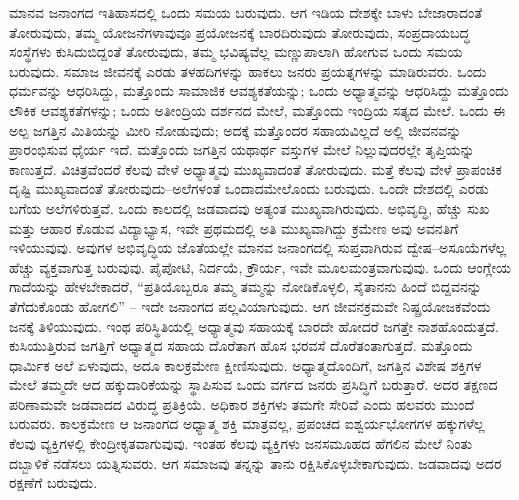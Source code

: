 ಮಾನವ ಜನಾಂಗದ ಇತಿಹಾಸದಲ್ಲಿ ಒಂದು ಸಮಯ ಬರುವುದು. ಆಗ ಇಡಿಯ ದೇಶಕ್ಕೇ ಬಾಳು ಬೇಜಾರಾದಂತೆ ತೋರುವುದು, ತಮ್ಮ ಯೋಜನೆಗಳಾವುವೂ ಪ್ರಯೋಜನಕ್ಕೆ ಬಾರದಿರುವುದು ತೋರುವುದು, ಸಂಪ್ರದಾಯಬದ್ಧ ಸಂಸ್ಥೆಗಳು ಕುಸಿದುಬಿದ್ದಂತೆ ತೋರುವುದು, ತಮ್ಮ ಭವಿಷ್ಯವೆಲ್ಲ ಮಣ್ಣುಪಾಲಾಗಿ ಹೋಗುವ ಒಂದು ಸಮಯ ಬರುವುದು. ಸಮಾಜ ಜೀವನಕ್ಕೆ ಎರಡು ತಳಹದಿಗಳನ್ನು ಹಾಕಲು ಜನರು ಪ್ರಯತ್ನಗಳನ್ನು ಮಾಡಿರುವರು. ಒಂದು ಧರ್ಮವನ್ನು ಆಧರಿಸಿದ್ದು, ಮತ್ತೊಂದು ಸಾಮಾಜಿಕ ಆವಶ್ಯಕತೆಯನ್ನು; ಒಂದು ಅಧ್ಯಾತ್ಮವನ್ನು ಆಧರಿಸಿದ್ದು ಮತ್ತೊಂದು ಲೌಕಿಕ ಆವಶ್ಯಕತೆಗಳನ್ನು; ಒಂದು ಅತೀಂದ್ರಿಯ ದರ್ಶನದ ಮೇಲೆ, ಮತ್ತೊಂದು ಇಂದ್ರಿಯ ಸತ್ಯದ ಮೇಲೆ. ಒಂದು ಈ ಅಲ್ಪ ಜಗತ್ತಿನ ಮಿತಿಯನ್ನು ಮೀರಿ ನೋಡುವುದು; ಅದಕ್ಕೆ ಮತ್ತೊಂದರ ಸಹಾಯವಿಲ್ಲದೆ ಅಲ್ಲಿ ಜೀವನವನ್ನು ಪ್ರಾರಂಭಿಸುವ ಧೈರ್ಯ ಇದೆ. ಮತ್ತೊಂದು ಜಗತ್ತಿನ ಯಥಾರ್ಥ ವಸ್ತುಗಳ ಮೇಲೆ ನಿಲ್ಲುವುದರಲ್ಲೇ ತೃಪ್ತಿಯನ್ನು ಕಾಣುತ್ತದೆ. ವಿಚಿತ್ರವೆಂದರೆ ಕೆಲವು ವೇಳೆ ಅಧ್ಯಾತ್ಮವು ಮುಖ್ಯವಾದಂತೆ ತೋರುವುದು. ಮತ್ತೆ ಕೆಲವು ವೇಳೆ ಪ್ರಾಪಂಚಿಕ ದೃಷ್ಟಿ ಮುಖ್ಯವಾದಂತೆ ತೋರುವುದು–ಅಲೆಗಳಂತೆ ಒಂದಾದಮೇಲೊಂದು ಬರುವುದು. ಒಂದೇ ದೇಶದಲ್ಲಿ ಎರಡು ಬಗೆಯ ಅಲೆಗಳಿರುತ್ತವೆ. ಒಂದು ಕಾಲದಲ್ಲಿ ಜಡವಾದವು ಅತ್ಯಂತ ಮುಖ್ಯವಾಗಿರುವುದು. ಅಭಿವೃದ್ಧಿ, ಹೆಚ್ಚು ಸುಖ ಮತ್ತು ಆಹಾರ ಕೊಡುವ ವಿದ್ಯಾಭ್ಯಾಸ, ಇವೇ ಪ್ರಥಮದಲ್ಲಿ ಅತಿ ಮುಖ್ಯವಾಗಿದ್ದು ಕ್ರಮೇಣ ಅವು ಅವನತಿಗೆ ಇಳಿಯುವುವು. ಅವುಗಳ ಅಭಿವೃದ್ಧಿಯ ಜೊತೆಯಲ್ಲೇ ಮಾನವ ಜನಾಂಗದಲ್ಲಿ ಸುಪ್ತವಾಗಿರುವ ದ್ವೇಷ–ಅಸೂಯೆಗಳೆಲ್ಲ ಹೆಚ್ಚು ವ್ಯಕ್ತವಾಗುತ್ತ ಬರುವುವು. ಪೈಪೋಟಿ, ನಿರ್ದಯೆ, ಕ್ರೌರ್ಯ, ಇವೇ ಮೂಲಮಂತ್ರವಾಗುವುವು. ಒಂದು ಆಂಗ್ಲೇಯ ಗಾದೆಯನ್ನು ಹೇಳಬೇಕಾದರೆ, “ಪ್ರತಿಯೊಬ್ಬರೂ ತಮ್ಮ ತಮ್ಮನ್ನು ನೋಡಿಕೊಳ್ಳಲಿ, ಸೈತಾನನು ಹಿಂದೆ ಬಿದ್ದವನನ್ನು ತೆಗೆದುಕೊಂಡು ಹೋಗಲಿ” – ಇದೇ ಜನಾಂಗದ ಪಲ್ಲವಿಯಾಗುವುದು. ಆಗ ಜೀವನಕ್ರಮವೇ ನಿಷ್ಪ್ರಯೋಜಕವೆಂದು ಜನಕ್ಕೆ ತಿಳಿಯುವುದು. ಇಂಥ ಪರಿಸ್ಥಿತಿಯಲ್ಲಿ ಅಧ್ಯಾತ್ಮವು ಸಹಾಯಕ್ಕೆ ಬಾರದೇ ಹೋದರೆ ಜಗತ್ತೇ ನಾಶಹೊಂದುತ್ತದೆ. ಕುಸಿಯುತ್ತಿರುವ ಜಗತ್ತಿಗೆ ಅಧ್ಯಾತ್ಮದ ಸಹಾಯ ದೊರೆತಾಗ ಹೊಸ ಭರವಸೆ ದೊರೆತಂತಾಗುತ್ತದೆ. ಮತ್ತೊಂದು ಧಾರ್ಮಿಕ ಅಲೆ ಏಳುವುದು, ಅದೂ ಕಾಲಕ್ರಮೇಣ ಕ್ಷೀಣಿಸುವುದು. ಅಧ್ಯಾತ್ಮದೊಂದಿಗೆ, ಜಗತ್ತಿನ ವಿಶೇಷ ಶಕ್ತಿಗಳ ಮೇಲೆ ತಮ್ಮದೇ ಆದ ಹಕ್ಕುದಾರಿಕೆಯನ್ನು ಸ್ಥಾಪಿಸುವ ಒಂದು ವರ್ಗದ ಜನರು ಪ್ರಸಿದ್ಧಿಗೆ ಬರುತ್ತಾರೆ. ಅದರ ತಕ್ಷಣದ ಪರಿಣಾಮವೇ ಜಡವಾದದ ವಿರುದ್ಧ ಪ್ರತಿಕ್ರಿಯೆ. ಅಧಿಕಾರ ಶಕ್ತಿಗಳು ತಮಗೇ ಸೇರಿವೆ ಎಂದು ಹಲವರು ಮುಂದೆ ಬರುವರು. ಕಾಲಕ್ರಮೇಣ ಆ ಜನಾಂಗದ ಅಧ್ಯಾತ್ಮ ಶಕ್ತಿ ಮಾತ್ರವಲ್ಲ, ಪ್ರಪಂಚದ ಐಶ್ವರ್ಯಭೋಗಗಳ ಹಕ್ಕುಗಳೆಲ್ಲ ಕೆಲವು ವ್ಯಕ್ತಿಗಳಲ್ಲಿ ಕೇಂದ್ರೀಕೃತವಾಗುವುವು. ಇಂತಹ ಕೆಲವು ವ್ಯಕ್ತಿಗಳು ಜನಸಮೂಹದ ಹೆಗಲಿನ ಮೇಲೆ ನಿಂತು ದಬ್ಬಾಳಿಕೆ ನಡೆಸಲು ಯತ್ನಿಸುವರು. ಆಗ ಸಮಾಜವು ತನ್ನನ್ನು ತಾನು ರಕ್ಷಿಸಿಕೊಳ್ಳಬೇಕಾಗುವುದು. ಜಡವಾದವು ಅದರ ರಕ್ಷಣೆಗೆ ಬರುವುದು. 

